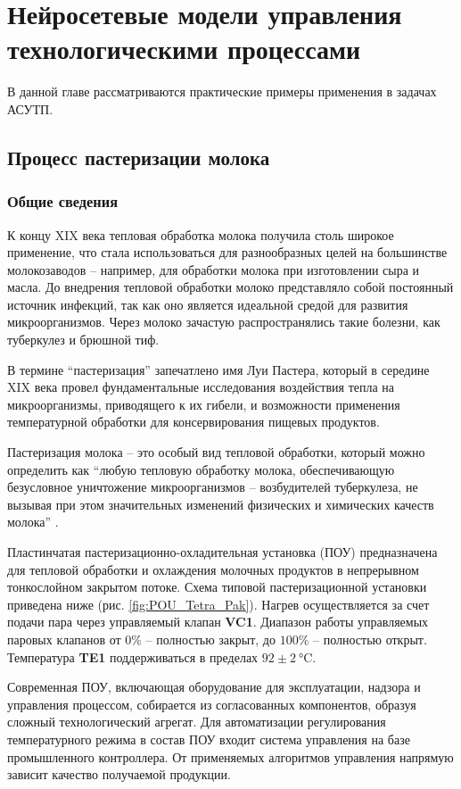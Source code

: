 \chapter{Нейросетевые модели управления технологическими процессами}

В данной главе рассматриваются практические примеры применения в задачах АСУТП.

\section{Процесс пастеризации молока}

\subsection{Общие сведения}

К концу XIX века тепловая обработка молока получила столь широкое применение, что стала использоваться для разнообразных целей на большинстве молокозаводов – например, для обработки молока при изготовлении сыра и масла. До внедрения тепловой обработки молоко представляло собой постоянный источник инфекций, так как оно является идеальной средой для развития микроорганизмов. Через молоко зачастую распространялись такие болезни, как туберкулез и брюшной тиф.

В термине “пастеризация” запечатлено имя Луи Пастера, который в середине XIX века провел фундаментальные исследования воздействия тепла на микроорганизмы, приводящего к их гибели, и возможности применения температурной обработки для консервирования пищевых продуктов.

Пастеризация молока – это особый вид тепловой обработки, который можно определить как “любую тепловую обработку молока, обеспечивающую безусловное уничтожение микроорганизмов – возбудителей туберкулеза, не вызывая при этом значительных изменений физических и химических качеств молока” \cite{TetraPak1995}.

Пластинчатая пастеризационно-охладительная установка (ПОУ) предназначена для тепловой обработки и охлаждения молочных продуктов в непрерывном тонкослойном закрытом потоке. Схема типовой пастеризационной установки приведена ниже (рис. \ref{fig:POU_Tetra_Pak}). Нагрев осуществляется за счет подачи пара через управляемый клапан \textbf{VC1}. Диапазон работы управляемых паровых клапанов от $\text{0\%}$ – полностью закрыт, до $\text{100\%}$ – полностью открыт. Температура \textbf{TE1} поддерживаться в пределах $92 \pm 2 \SI{}{\celsius}$.

Современная ПОУ, включающая оборудование для эксплуатации, надзора и управления процессом, собирается из согласованных компонентов, образуя сложный технологический агрегат. Для автоматизации регулирования температурного режима в состав ПОУ входит система управления на базе промышленного контроллера. От применяемых алгоритмов управления напрямую зависит качество получаемой продукции.

